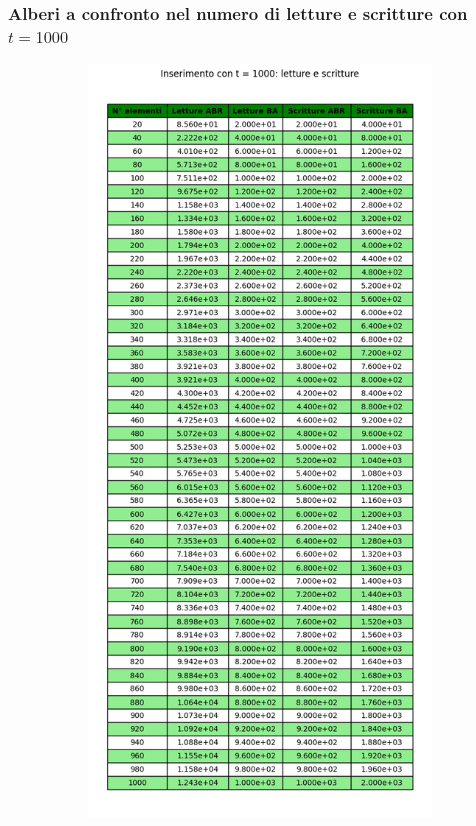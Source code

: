 \subsubsection{Alberi a confronto nel numero di letture e scritture con $t = 1000$}


\begin{figure}[H]
    \centering
    \begin{subfigure}[b]{0.49\textwidth}
        \centering
        \includegraphics[width=\textwidth]{tables/insert-wr-t1000.png}

\end{subfigure}
\end{figure}
